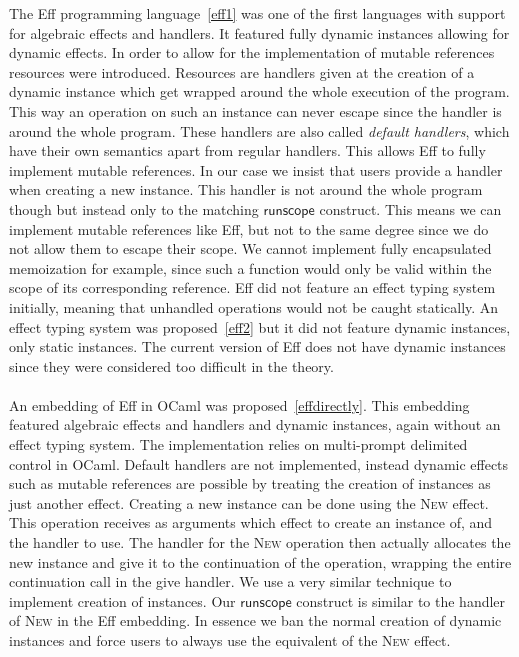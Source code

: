 The Eff programming language~\ref{eff1} was one of the first languages with support for algebraic effects and handlers.
It featured fully dynamic instances allowing for dynamic effects.
In order to allow for the implementation of mutable references resources were introduced.
Resources are handlers given at the creation of a dynamic instance which get wrapped around the whole execution of the program.
This way an operation on such an instance can never escape since the handler is around the whole program.
These handlers are also called \emph{default handlers}, which have their own semantics apart from regular handlers.
This allows Eff to fully implement mutable references.
In our case we insist that users provide a handler when creating a new instance.
This handler is not around the whole program though but instead only to the matching $\mathsf{runscope}$ construct.
This means we can implement mutable references like Eff, but not to the same degree since we do not allow them to escape their scope.
We cannot implement fully encapsulated memoization for example, since such a function would only be valid within the scope of its corresponding reference.
Eff did not feature an effect typing system initially, meaning that unhandled operations would not be caught statically.
An effect typing system was proposed~\ref{eff2} but it did not feature dynamic instances, only static instances.
The current version of Eff does not have dynamic instances since they were considered too difficult in the theory.
\\\\
An embedding of Eff in OCaml was proposed~\ref{effdirectly}.
This embedding featured algebraic effects and handlers and dynamic instances, again without an effect typing system.
The implementation relies on multi-prompt delimited control in OCaml.
Default handlers are not implemented, instead dynamic effects such as mutable references are possible by treating the creation of instances as just another effect.
Creating a new instance can be done using the \textsc{New} effect.
This operation receives as arguments which effect to create an instance of, and the handler to use.
The handler for the \textsc{New} operation then actually allocates the new instance and give it to the continuation of the operation, wrapping the entire continuation call in the give handler.
We use a very similar technique to implement creation of instances.
Our $\mathsf{runscope}$ construct is similar to the handler of \textsc{New} in the Eff embedding.
In essence we ban the normal creation of dynamic instances and force users to always use the equivalent of the \textsc{New} effect.
